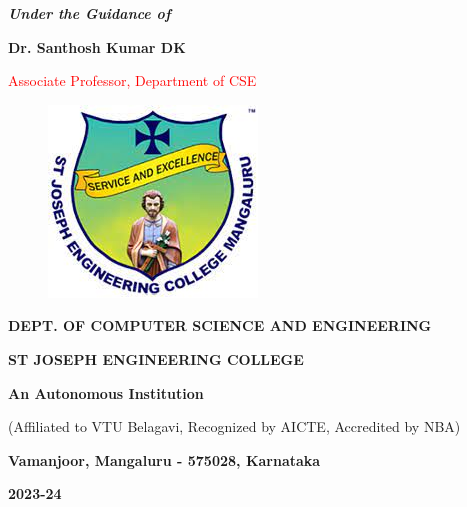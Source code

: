 \documentclass[12pt,a4paper]{report}
\begin{document}
\begin{center}
\vspace{12pt}
\textit{\textbf{Under the Guidance of}}
\par
\vspace{6pt}
\textbf{Dr. Santhosh Kumar DK}
\par
\vspace{2pt}
\normalsize { \textcolor{red}{Associate Professor, Department of CSE } }
\par
\begin{figure}[hbtp]
\centering
\includegraphics[scale=0.6]{./pic/sjeclogo}
\end{figure}
\large \textbf{DEPT. OF COMPUTER SCIENCE AND ENGINEERING}
\par \Large \textbf{ST JOSEPH ENGINEERING COLLEGE}
\par 
\textbf{An Autonomous Institution}
\par
{\large{(Affiliated to VTU Belagavi, Recognized by AICTE, Accredited by NBA)}}
\par
{\large \textbf{Vamanjoor, Mangaluru - 575028, Karnataka}}
\par 
{\Large \textbf{2023-24}}
\end{center}
\newpage
\end{document}
